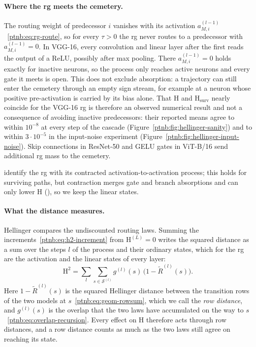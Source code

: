 \paragraph{Where the \ac{rg} meets the cemetery.}
The routing weight of predecessor $i$ vanishes with its activation $a^{(l-1)}_{M,i}$~\eqref{ptnb:eq:rg-route}, so for every $\tau>0$ the \ac{rg} never routes to a predecessor with $a^{(l-1)}_{M,i}=0$. In VGG-16, every convolution and linear layer after the first reads the output of a ReLU, possibly after max pooling. There $a^{(l-1)}_{M,i}=0$ holds exactly for inactive neurons, so the process only reaches active neurons and every gate it meets is open. This does not exclude absorption: a trajectory can still enter the cemetery through an empty sign stream, for example at a neuron whose positive pre-activation is carried by its bias alone. That $\mathrm H$ and $\mathrm H_{\mathrm{surv}}$ nearly coincide for the VGG-16 \ac{rg} is therefore an observed numerical result and not a consequence of avoiding inactive predecessors: their reported means agree to within $10^{-8}$ at every step of the cascade (Figure~\ref{ptnb:fig:hellinger-sanity}) and to within $3\cdot10^{-5}$ in the input-noise experiment (Figure~\ref{ptnb:fig:hellinger-input-noise}). Skip connections in ResNet-50 and GELU gates in ViT-B/16 send additional \ac{rg} mass to the cemetery.

\textcite{playingBackward2026} identify the \ac{rg} with its contracted activation-to-activation process; this holds for surviving paths, but contraction merges gate and branch absorptions and can only lower $\mathrm H$ (), so we keep the linear states.


\paragraph{What the distance measures.}
Hellinger compares the undiscounted routing laws. Summing the increments~\eqref{ptnb:eq:h2-increment} from $\mathrm H^{(L)}=0$ writes the squared distance as a sum over the steps $l$ of the process and their ordinary states, which for the \ac{rg} are the activation and the linear states of every layer:
\begin{equation}\label{ptnb:eq:h2-local}
 \mathrm H^2=\sum_{l}\sum_{s\in\mathcal S^{(l)}}g^{(l)}(s)\,\bigl(1-\widetilde R^{(l)}(s)\bigr).
\end{equation}
Here $1-\widetilde R^{(l)}(s)$ is the squared Hellinger distance between the transition rows of the two models at $s$~\eqref{ptnb:eq:geom-rowsum}, which we call the \emph{row distance}, and $g^{(l)}(s)$ is the overlap that the two laws have accumulated on the way to $s$~\eqref{ptnb:eq:overlap-recursion}. Every effect on $\mathrm H$ therefore acts through row distances, and a row distance counts as much as the two laws still agree on reaching its state.

